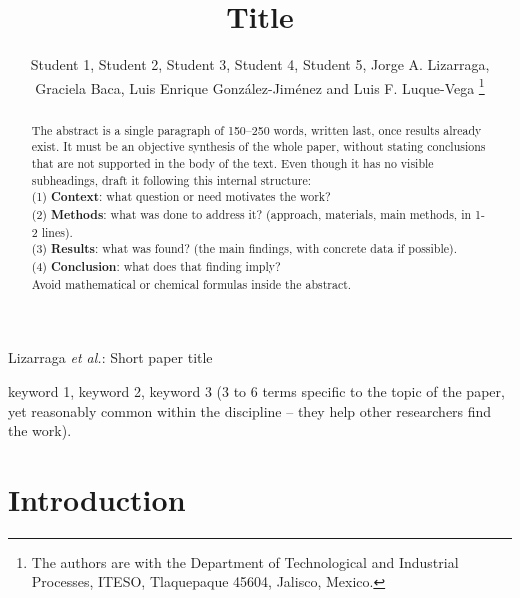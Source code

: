 \documentclass[lettersize,journal]{IEEEtran}
\begin{document}
\title{Title}

\author{Student 1, Student 2, Student 3, Student 4, Student 5, Jorge A. Lizarraga, Graciela Baca, Luis Enrique González-Jiménez and Luis F. Luque-Vega
\thanks{The authors are with the Department of Technological and
Industrial Processes, ITESO, Tlaquepaque 45604, Jalisco, Mexico.}}

%
{Lizarraga \MakeLowercase{\textit{et al.}}: Short paper title}

\maketitle

\begin{abstract}
The abstract is a single paragraph of 150--250 words, written last,
once results already exist. It must be an objective synthesis of the
whole paper, without stating conclusions that are not supported in the
body of the text. Even though it has no visible subheadings, draft it
following this internal structure: \\
(1) \textbf{Context}: what question or need motivates the work? \\
(2) \textbf{Methods}: what was done to address it? (approach,
materials, main methods, in 1-2 lines). \\
(3) \textbf{Results}: what was found? (the main findings, with
concrete data if possible). \\
(4) \textbf{Conclusion}: what does that finding imply? \\
Avoid mathematical or chemical formulas inside the abstract.
\end{abstract}

\begin{IEEEkeywords}
keyword 1, keyword 2, keyword 3 (3 to 6 terms specific to the
topic of the paper, yet reasonably common within the discipline --
they help other researchers find the work).
\end{IEEEkeywords}

\section{Introduction}
\end{document}
